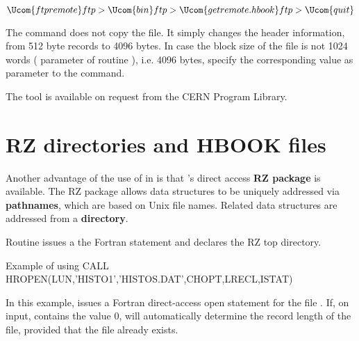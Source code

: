 \begin{XMP}
$ \Ucom{ftp remote}
ftp> \Ucom{bin}
ftp> \Ucom{get remote.hbook}
ftp> \Ucom{quit}
$ 
\end{XMP}

The  command does not copy the file. 
It simply changes the header information, from 512 byte records to 4096 bytes.
In case the block size of the \HBOOK{} file is not 1024 words  (
parameter of routine ), i.e. 4096 bytes, specify the corresponding
value as parameter to the  command.

The  tool is available on request from the CERN Program Library.

\bigskip


\finalnewpage
{}
\section{RZ directories and HBOOK files}
%

Another advantage of the use of \ZEBRA{} in \HBOOK{} is that \ZEBRA{}'s direct
access {\bf RZ package} is available.
The RZ package allows data structures to
%
be uniquely addressed via {\bf pathnames}, which are based on
Unix file names.  
Related data structures are addressed from a {\bf directory}. 

Routine  issues a 
the Fortran  statement and declares the
RZ top directory.

\begin{XMPt}{Example of using \protect{}}
      CALL HROPEN(LUN,'HISTO1','HISTOS.DAT',CHOPT,LRECL,ISTAT)
\end{XMPt}

In this example,  issues a Fortran direct-access open
statement for the file . 
If, on input,  contains the value 0,  will
automatically determine the record length of the file, provided
that the file already exists.

